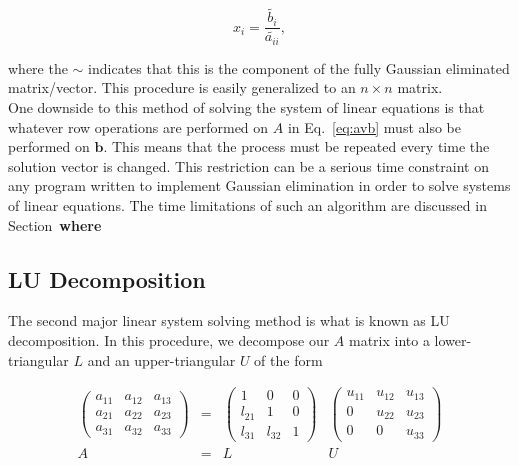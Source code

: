 \documentclass[12pt]{article}
\numberwithin{equation}{section}
\begin{document}
\begin{equation}
x_{i} = \frac{\widetilde{b_{i}}}{\widetilde{a_{ii}}},
\end{equation}

\noindent where the $\sim$ indicates that this is the component of the fully Gaussian eliminated matrix/vector.  This procedure is easily generalized to an $n\times n$ matrix.
\\\indent One downside to this method of solving the system of linear equations is that whatever row operations are performed on $A$ in Eq.~\ref{eq:avb} must also be performed on $\textbf{b}$.  This means that the process must be repeated every time the solution vector is changed.  This restriction can be a serious time constraint on any program written to implement Gaussian elimination in order to solve systems of linear equations.  The time limitations of such an algorithm are discussed in Section~\textbf{where}%

\subsection{LU Decomposition}
\label{subsec:ludecomp}

The second major linear system solving method is what is known as LU decomposition.  In this procedure, we decompose our $A$ matrix into a lower-triangular $L$ and an upper-triangular $U$ of the form

\begin{equation}
\label{eq:ludecomp1}
\begin{array}{cccc}
\left(
\begin{array}{ccc}
a_{11} & a_{12} & a_{13} \\
a_{21} & a_{22} & a_{23} \\
a_{31} & a_{32} & a_{33}
\end{array}
\right) &=&
\left(
\begin{array}{ccc}
1 & 0 & 0 \\
l_{21} & 1 & 0 \\
l_{31} & l_{32} & 1
\end{array}\right)&
\left(\begin{array}{ccc}
u_{11} & u_{12} & u_{13} \\
0 & u_{22} & u_{23} \\
0 & 0 & u_{33}
\end{array}\right) \\
A &=& L&U
\end{array}
\end{equation}
\end{document}
